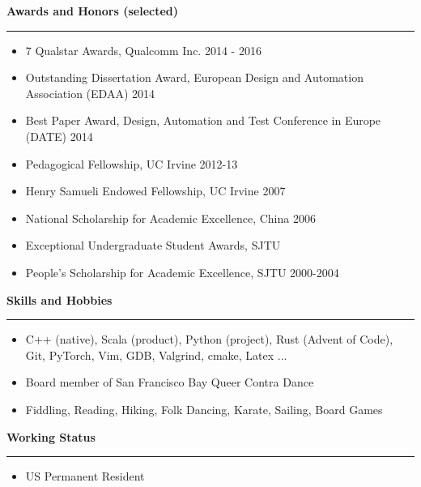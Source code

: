 \documentclass[10pt,A4]{article}
\newcommand{\cvsection}[1]
{
	\begin{flushleft}
  \LARGE\textcolor{sectcol}{\textbf{  #1}}
	\end{flushleft}
  \vspace{-15pt}
  \textcolor{softcol}{\hrule}
  \vspace{8pt}
}
\newcommand{\mystrut}{\rule[-.3\baselineskip]{0pt}{\baselineskip}}
\begin{document}
\cvsection{Awards and Honors (selected)}
\vspace{-4pt}
\begin{itemize}
 \setlength\itemsep{-0.1cm}
 \item 7 Qualstar Awards, Qualcomm Inc. 2014 - 2016
 \item Outstanding Dissertation Award, European Design and Automation Association (EDAA) 2014
 \item Best Paper Award, Design, Automation and Test Conference in Europe (DATE) 2014
 \item Pedagogical Fellowship, UC Irvine 2012-13
 \item Henry Samueli Endowed Fellowship, UC Irvine 2007
 \item National Scholarship for Academic Excellence, China 2006
 \item Exceptional Undergraduate Student Awards, SJTU
 \item People's Scholarship for Academic Excellence, SJTU 2000-2004
\end{itemize}

\cvsection{Skills and Hobbies}
\vspace{-4pt}
\begin{itemize}
 \setlength\itemsep{-0.1cm}
 \item C++ (native), Scala (product), Python (project), Rust (Advent of Code), Git, PyTorch, Vim, GDB, Valgrind, cmake, Latex ...
 \item Board member of San Francisco Bay Queer Contra Dance
 \item Fiddling, Reading, Hiking, Folk Dancing, Karate, Sailing, Board Games
\end{itemize}

\cvsection{Working Status}
\vspace{-4pt}
\begin{itemize}
 \item US Permanent Resident
\end{itemize}







%
%
%
%
%
%
\end{document}

